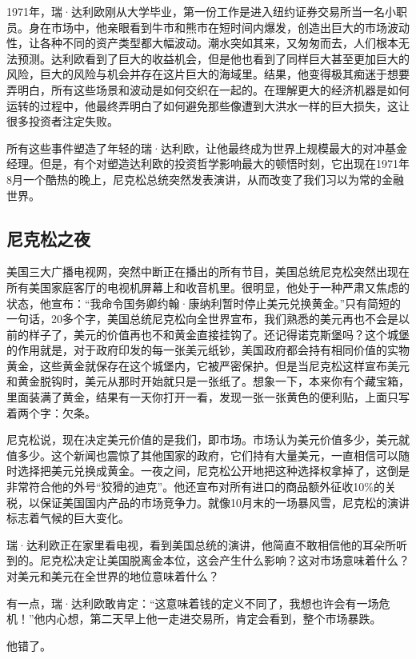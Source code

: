 1971年，瑞·达利欧刚从大学毕业，第一份工作是进入纽约证券交易所当一名小职员。身在市场中，他亲眼看到牛市和熊市在短时间内爆发，创造出巨大的市场波动性，让各种不同的资产类型都大幅波动。潮水突如其来，又匆匆而去，人们根本无法预测。达利欧看到了巨大的收益机会，但是他也看到了同样巨大甚至更加巨大的风险，巨大的风险与机会并存在这片巨大的海域里。结果，他变得极其痴迷于想要弄明白，所有这些场景和波动是如何交织在一起的。在理解更大的经济机器是如何运转的过程中，他最终弄明白了如何避免那些像遭到大洪水一样的巨大损失，这让很多投资者注定失败。

所有这些事件塑造了年轻的瑞·达利欧，让他最终成为世界上规模最大的对冲基金经理。但是，有个对塑造达利欧的投资哲学影响最大的顿悟时刻，它出现在1971年8月一个酷热的晚上，尼克松总统突然发表演讲，从而改变了我们习以为常的金融世界。

\subsection{尼克松之夜}

美国三大广播电视网，突然中断正在播出的所有节目，美国总统尼克松突然出现在所有美国家庭客厅的电视机屏幕上和收音机里。很明显，他处于一种严肃又焦虑的状态，他宣布：“我命令国务卿约翰·康纳利暂时停止美元兑换黄金。”只有简短的一句话，20多个字，美国总统尼克松向全世界宣布，我们熟悉的美元再也不会是以前的样子了，美元的价值再也不和黄金直接挂钩了。还记得诺克斯堡吗？这个城堡的作用就是，对于政府印发的每一张美元纸钞，美国政府都会持有相同价值的实物黄金，这些黄金就保存在这个城堡内，它被严密保护。但是当尼克松这样宣布美元和黄金脱钩时，美元从那时开始就只是一张纸了。想象一下，本来你有个藏宝箱，里面装满了黄金，结果有一天你打开一看，发现一张一张黄色的便利贴，上面只写着两个字：欠条。

尼克松说，现在决定美元价值的是我们，即市场。市场认为美元价值多少，美元就值多少。这个新闻也震惊了其他国家的政府，它们持有大量美元，一直相信可以随时选择把美元兑换成黄金。一夜之间，尼克松公开地把这种选择权拿掉了，这倒是非常符合他的外号“狡猾的迪克”。他还宣布对所有进口的商品额外征收10\%的关税，以保证美国国内产品的市场竞争力。就像10月末的一场暴风雪，尼克松的演讲标志着气候的巨大变化。

瑞·达利欧正在家里看电视，看到美国总统的演讲，他简直不敢相信他的耳朵所听到的。尼克松决定让美国脱离金本位，这会产生什么影响？这对市场意味着什么？对美元和美元在全世界的地位意味着什么？

有一点，瑞·达利欧敢肯定：“这意味着钱的定义不同了，我想也许会有一场危机！”他内心想，第二天早上他一走进交易所，肯定会看到，整个市场暴跌。

他错了。

